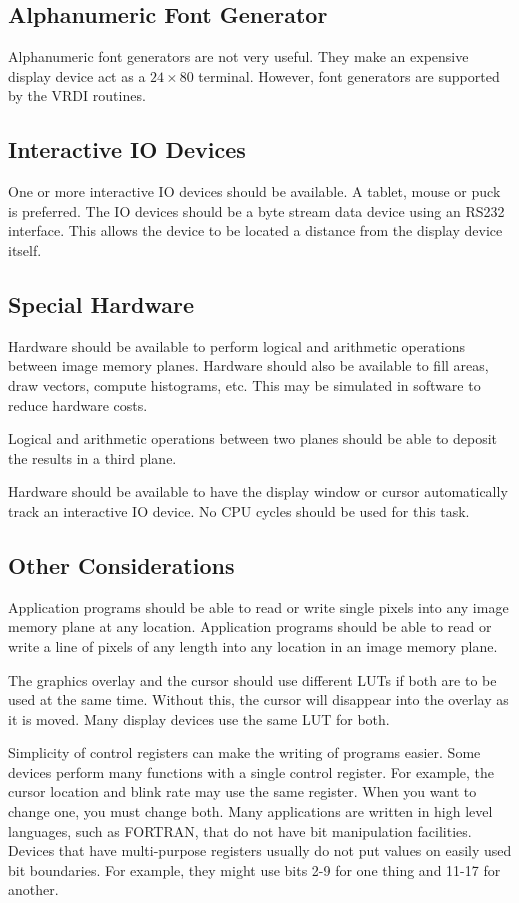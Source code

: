 \subsection{Alphanumeric Font Generator}
Alphanumeric font generators are not very useful.  They make
an expensive display device act as a $24 \times 80$ terminal.  
However, font generators are supported by the VRDI routines.
\subsection{Interactive IO Devices}
One or more interactive IO devices should be available.  A
tablet, mouse or puck is preferred.  The IO devices should be a byte
stream data device using an RS232 interface.  This allows the device
to be located a distance from the display device itself.
\subsection{Special Hardware}
Hardware should be available to perform logical and
arithmetic operations between image memory planes.  Hardware
should also be available to fill areas, draw
vectors, compute histograms, etc.  This may be simulated in software
to reduce hardware costs.

Logical and arithmetic operations between two
planes should be able to deposit the results in a third plane.

Hardware should be available to have the display window or
cursor automatically track an interactive IO device.  No CPU cycles
should be used for this task.
\subsection{Other Considerations}
Application programs should be able to read or write single
pixels into any image memory plane at any location.  Application
programs should be able to read or write a line of pixels of any
length into any location in an image memory plane.  

The graphics overlay and the cursor should use different LUTs
if both are to be used at the same time.  Without this,
the cursor will disappear into the overlay as it is moved.  Many
display devices use the same LUT for both.

Simplicity of control registers can make the writing of
programs easier.  Some devices perform many functions with a single
control register.  For example, the cursor
location and blink rate may use the same register.  When you want to
change one, you must change both.  Many applications are written in
high level languages, such as FORTRAN, that do not have bit
manipulation facilities.  Devices that have multi-purpose registers usually
do not put values on easily used bit boundaries.  For example, they
might use bits 2-9 for one thing and 11-17 for another.

